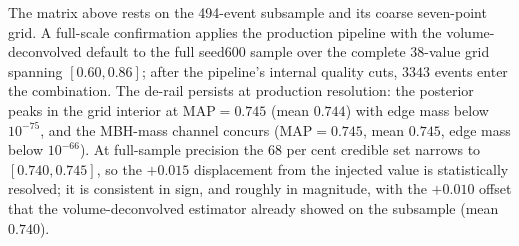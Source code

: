 The matrix above rests on the 494-event subsample and its coarse seven-point grid. A full-scale confirmation applies the production pipeline with the volume-deconvolved default to the full seed600 sample over the complete 38-value grid spanning $[0.60, 0.86]$; after the pipeline's internal quality cuts, $3343$ events enter the combination. The de-rail persists at production resolution: the posterior peaks in the grid interior at $\mathrm{MAP} = 0.745$ (mean $0.744$) with edge mass below $10^{-75}$, and the MBH-mass channel concurs ($\mathrm{MAP} = 0.745$, mean $0.745$, edge mass below $10^{-66}$). %
At full-sample precision the 68 per cent credible set narrows to $[0.740, 0.745]$, so the $+0.015$ displacement from the injected value is statistically resolved; it is consistent in sign, and roughly in magnitude, with the $+0.010$ offset that the volume-deconvolved estimator already showed on the subsample (mean $0.740$). %
